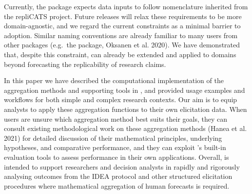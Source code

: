\documentclass[
  11pt,
  a4paper,
]{article}
\begin{document}
Currently, the package expects data inputs to follow nomenclature
inherited from the repliCATS project. Future releases will relax these
requirements to be more domain-agnostic, and we regard the current
constraints as a minimal barrier to adoption. Similar naming conventions
are already familiar to many users from other  packages
(e.g.~the  package, Oksanen et al. 2020). We have
demonstrated that, despite this constraint,  can already
be extended and applied to domains beyond forecasting the replicability
of research claims.

In this paper we have described the computational implementation of the
aggregation methods and supporting tools in , and provided
usage examples and workflows for both simple and complex research
contexts. Our aim is to equip analysts to apply these aggregation
functions to their own elicitation data. When users are unsure which
aggregation method best suits their goals, they can consult existing
methodological work on these aggregation methods ({Hanea et al.} 2021)
for detailed discussion of their mathematical principles, underlying
hypotheses, and comparative performance, and they can exploit
's built-in evaluation tools to assess performance in
their own applications. Overall,  is intended to support
researchers and decision analysts in rapidly and rigorously analysing
outcomes from the IDEA protocol and other structured elicitation
procedures where mathematical aggregation of human forecasts is
required.

\newpage
\blandscape

\begingroup\fontsize{6}{8}\selectfont
\end{document}
